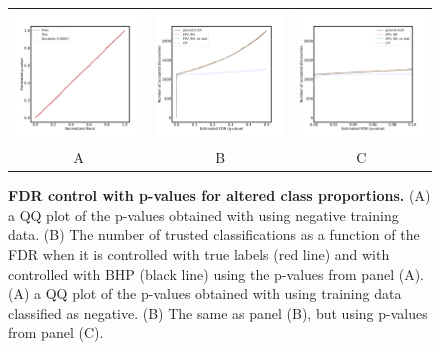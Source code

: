 \documentclass{article}
\begin{document}
\begin{figure}
    \advance\leftskip-0.5cm
        \begin{tabular}{ccc}
 		\includegraphics[width=2.5in]{img/cnn_QQ_balanced.pdf} &
		\includegraphics[width=2.5in]{img/cnn_balanced_fdr_control.pdf} & 
            \includegraphics[width=2.5in]{img/cnn_balanced_fdr_control_loc.pdf}
		\\	
		A & B & C
	\end{tabular}
	\caption{{\bf  FDR control with p-values for altered class proportions.}
		(A) a QQ plot of the p-values obtained with using negative training data. (B) The number of trusted classifications as a function of the FDR when it is controlled with true labels (red line) and with controlled with BHP (black line) using the p-values from panel (A).
		(A) a QQ plot of the p-values obtained with using training data classified as negative. (B) The same as panel (B), but using p-values from panel (C).
	}
	\label{fig:balanced}
\end{figure}
\end{document}
